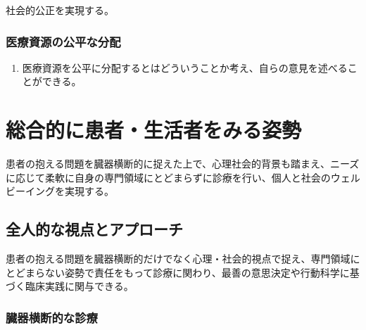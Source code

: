 \documentclass[
]{ltjsarticle}
\providecommand{\tightlist}{%
  \setlength{\itemsep}{0pt}\setlength{\parskip}{0pt}}
\begin{document}
社会的公正を実現する。

\hypertarget{ux533bux7642ux8cc7ux6e90ux306eux516cux5e73ux306aux5206ux914d}{%
\subsubsection{医療資源の公平な分配}\label{ux533bux7642ux8cc7ux6e90ux306eux516cux5e73ux306aux5206ux914d}}

\begin{enumerate}
\def\labelenumi{\arabic{enumi}.}
\tightlist
\item
  医療資源を公平に分配するとはどういうことか考え、自らの意見を述べることができる。
\end{enumerate}

\newpage

\hypertarget{ux7dcfux5408ux7684ux306bux60a3ux8005ux751fux6d3bux8005ux3092ux307fux308bux59ffux52e2}{%
\section{総合的に患者・生活者をみる姿勢}\label{ux7dcfux5408ux7684ux306bux60a3ux8005ux751fux6d3bux8005ux3092ux307fux308bux59ffux52e2}}

患者の抱える問題を臓器横断的に捉えた上で、心理社会的背景も踏まえ、ニーズに応じて柔軟に自身の専門領域にとどまらずに診療を行い、個人と社会のウェルビーイングを実現する。

\hypertarget{ux5168ux4ebaux7684ux306aux8996ux70b9ux3068ux30a2ux30d7ux30edux30fcux30c1}{%
\subsection{全人的な視点とアプローチ}\label{ux5168ux4ebaux7684ux306aux8996ux70b9ux3068ux30a2ux30d7ux30edux30fcux30c1}}

患者の抱える問題を臓器横断的だけでなく心理・社会的視点で捉え、専門領域にとどまらない姿勢で責任をもって診療に関わり、最善の意思決定や行動科学に基づく臨床実践に関与できる。

\hypertarget{ux81d3ux5668ux6a2aux65adux7684ux306aux8a3aux7642}{%
\subsubsection{臓器横断的な診療}\label{ux81d3ux5668ux6a2aux65adux7684ux306aux8a3aux7642}}
\end{document}

